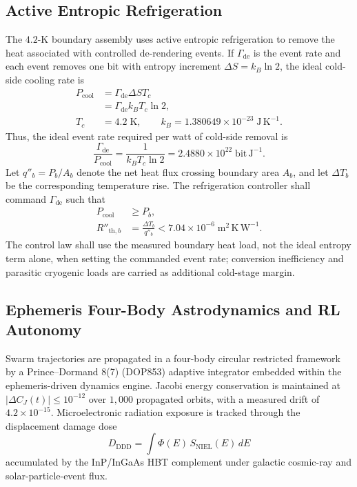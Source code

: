 \documentclass[10pt,twocolumn]{IEEEtran}
\begin{document}
\subsection{Active Entropic Refrigeration}

The $4.2$-K boundary assembly uses active entropic refrigeration to remove the heat associated with controlled de-rendering events.  If $\Gamma_{\mathrm{de}}$ is the event rate and each event removes one bit with entropy increment $\Delta S=k_B\ln 2$, the ideal cold-side cooling rate is
\begin{equation}
\begin{aligned}
P_{\mathrm{cool}}
&=\Gamma_{\mathrm{de}}\Delta S T_c \\
&=\Gamma_{\mathrm{de}}k_B T_c\ln 2, \\
T_c&=4.2\;\mathrm{K},\qquad
k_B=1.380649\times10^{-23}\;\mathrm{J\,K^{-1}}.
\end{aligned}
\label{eq:entropic_refrigeration}
\end{equation}
Thus, the ideal event rate required per watt of cold-side removal is
\begin{equation}
\frac{\Gamma_{\mathrm{de}}}{P_{\mathrm{cool}}}
=\frac{1}{k_BT_c\ln2}
=2.4880\times10^{22}\;\mathrm{bit\,J^{-1}}.
\label{eq:derender_rate_per_watt}
\end{equation}
Let $q''_{b}=P_{b}/A_b$ denote the net heat flux crossing boundary area $A_b$, and let $\Delta T_b$ be the corresponding temperature rise.  The refrigeration controller shall command $\Gamma_{\mathrm{de}}$ such that
\begin{equation}
\begin{aligned}
P_{\mathrm{cool}}&\geq P_b, \\
R''_{\mathrm{th},b}
&=\frac{\Delta T_b}{q''_b}
<7.04\times10^{-6}\;\mathrm{m^2\,K\,W^{-1}}.
\end{aligned}
\label{eq:boundary_thermal_resistance}
\end{equation}
The control law shall use the measured boundary heat load, not the ideal entropy term alone, when setting the commanded event rate; conversion inefficiency and parasitic cryogenic loads are carried as additional cold-stage margin.

\subsection{Ephemeris Four-Body Astrodynamics and RL Autonomy}
\label{sec:ephemeris_rl}

Swarm trajectories are propagated in a four-body circular restricted
framework by a Prince--Dormand 8(7) (DOP853) adaptive integrator embedded
within the ephemeris-driven dynamics engine. Jacobi energy conservation
is maintained at $|\Delta C_J(t)|\leq10^{-12}$ over $1{,}000$ propagated
orbits, with a measured drift of $4.2\times10^{-15}$. Microelectronic
radiation exposure is tracked through the displacement damage dose
\begin{equation}
D_{\mathrm{DDD}}=\int\Phi(E)\,S_{\mathrm{NIEL}}(E)\,dE
\label{eq:ddd}
\end{equation}
accumulated by the InP/InGaAs HBT complement under galactic cosmic-ray
and solar-particle-event flux.
\end{document}
